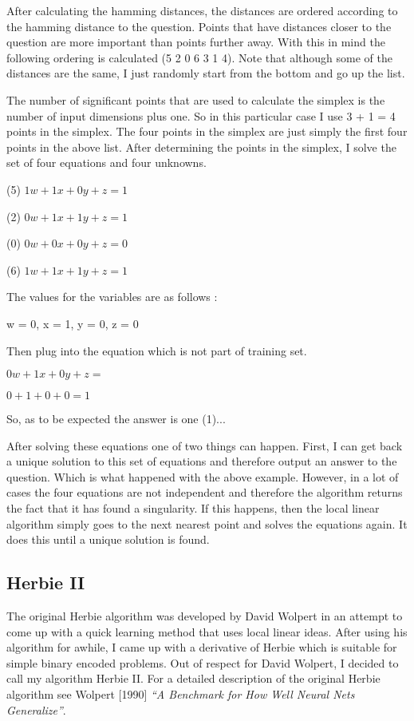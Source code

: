 	After calculating the hamming distances, the distances are
ordered according to the hamming distance to the question.  Points
that have distances closer to the question are more important than
points further away.  With this in mind the following ordering is
calculated (5 2 0 6 3 1 4).  Note that although some of the distances
are the same, I just randomly start from the bottom and go up the list.

	The number of significant points that are used to calculate
the simplex is the number of input dimensions plus one.  So in this
particular case I use 3 + 1 = 4 points in the simplex.  The four
points in the simplex are just simply the first four points in the
above list.  After determining the points in the simplex, I solve the
set of four equations and four unknowns.  

      	(5)    $1w + 1x + 0y + z = 1$
      
      	(2)    $0w + 1x + 1y + z = 1$      

      	(0)    $0w + 0x + 0y + z = 0$ 

      	(6)    $1w + 1x + 1y + z = 1$

       	The values for the variables are as follows :

               w = 0,  x = 1,  y = 0,  z = 0

        Then plug into the equation which is not part of training set.

          $0w + 1x + 0y + z = $

          $0 + 1 + 0 + 0 = 1$

        So, as to be expected the answer is one (1)...

	After solving these equations one of two things can happen.
First, I can get back a unique solution to this set of equations and
therefore output an answer to the question.  Which is what happened
with the above example.  However, in a lot of cases the four equations
are not independent and therefore the algorithm returns the fact that
it has found a singularity.  If this happens, then the local linear
algorithm simply goes to the next nearest point and solves the
equations again.  It does this until a unique solution is found.


\subsection{Herbie II}

	The original Herbie algorithm was developed by David Wolpert
in an attempt to come up with a quick learning method that uses local
linear ideas.  After using his algorithm for awhile, I came up with a
derivative of Herbie which is suitable for simple binary encoded
problems.  Out of respect for David Wolpert, I decided to call my
algorithm Herbie II.  For a detailed description of the original
Herbie algorithm see Wolpert [1990] {\it ``A Benchmark for How Well
Neural Nets Generalize''}.

